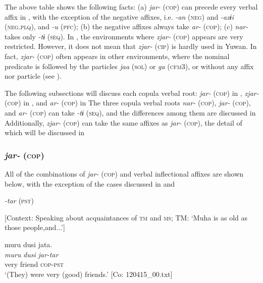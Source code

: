 The above table shows the following facts: (a) \textit{jar-} (\textsc{cop}) can precede every verbal affix in , with the exception of the negative affixes, i.e. \textit{-an} (\textsc{neg}) and \textit{-azɨi} (\textsc{neg}.\textsc{plq}), and \textit{-u} (\textsc{pfc}); (b) the negative affixes always take \textit{ar-} (\textsc{cop}); (c) \textit{nar-} takes only \textit{-tɨ} (\textsc{seq}). In , the environments where \textit{zjar-} (\textsc{cop}) appears are very restricted. However, it does not mean that \textit{zjar-} (\textsc{cip}) is hardly used in Yuwan. In fact, \textit{zjar-} (\textsc{cop}) often appears in other environments, where the nominal predicate is followed by the particles \textit{jaa} (\textsc{sol}) or \textit{ga} (\textsc{cfm3}), or without any affix nor particle (see ).

The following subsections will discuss each copula verbal root: \textit{jar-} (\textsc{cop}) in , \textit{zjar-} (\textsc{cop}) in , and \textit{ar-} (\textsc{cop}) in  The three copula verbal roots \textit{nar-} (\textsc{cop}), \textit{jar-} (\textsc{cop}), and \textit{ar-} (\textsc{cop}) can take \textit{-tɨ} (\textsc{seq}), and the differences among them are discussed in  Additionally, \textit{zjar-} (\textsc{cop}) can take the same affixes as \textit{jar-} (\textsc{cop}), the detail of which will be discussed in 

\subsubsection{\textit{jar-} (\textsc{cop})}

All of the combinations of \textit{jar-} (\textsc{cop}) and verbal inflectional affixes are shown below, with the exception of the cases discussed in  and 

\ea\label{ex:8-36}
\ea \textit{-tar} (\textsc{pst})

    [Context: Speaking about acquaintances of \textsc{tm} and \textsc{ms}; TM: ‘Muha is as old as those people,and...’]

{\TM}
\glll  muru  dusi  jata.\\
\textit{muru}  \textit{dusi}  \textit{jar-tar}\\
very  friend  \textsc{cop}-\textsc{pst}\\
\glt ‘(They) were very (good) friends.’ [Co: 120415\_00.txt]

